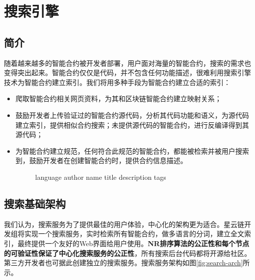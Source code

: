 \section{搜索引擎}
\label{sec:search}

\subsection{简介}

随着越来越多的智能合约被开发者部署，用户面对海量的智能合约，搜索的需求也变得突出起来。智能合约仅仅是代码，并不包含任何功能描述，很难利用搜索引擎技术为智能合约建立索引。我们将用多种手段为智能合约建立合适的索引：
\begin{itemize}
	\item 爬取智能合约相关网页资料，为其和区块链智能合约建立映射关系；
	\item 鼓励开发者上传验证过的智能合约源代码，分析其代码功能和语义，为源代码建立索引，提供相似合约搜索；未提供源代码的智能合约，进行反编译得到其源代码；
	\item 为智能合约建立规范，任何符合此规范的智能合约，都能被检索并被用户搜索到，鼓励开发者在创建智能合约时，提供合约信息描述。

	\begin{figure}[ht]
  	\centering
  	\begin{minipage}{.4\linewidth}
    	\begin{algorithm}[H]
  	  		 {
 	 			\String{} \Public{} language\;
 	 			\String{} \Public{} author\;
		 	 	\String{} \Public{} name\;
 	 			\String{} \Public{} title\;
		 	 	\String{} \Public{} description\;
		 	 	\String{} \Public{} tags\;
	  	  	}
    	\end{algorithm}
  	\end{minipage}
	\end{figure}

\end{itemize}

\subsection{搜索基础架构}

我们认为，搜索服务为了提供最佳的用户体验，中心化的架构更为适合。星云链开发组将实现一个搜索服务，实时检索所有智能合约，做多语言的分词，建立全文索引，最终提供一个友好的Web界面给用户使用。\textbf{NR排序算法的公正性和每个节点的可验证性保证了中心化搜索服务的公正性}，所有搜索后台代码都将开源给社区。第三方开发者也可据此创建独立的搜索服务。搜索服务架构如图\ref{fig:search-arch}所示。

